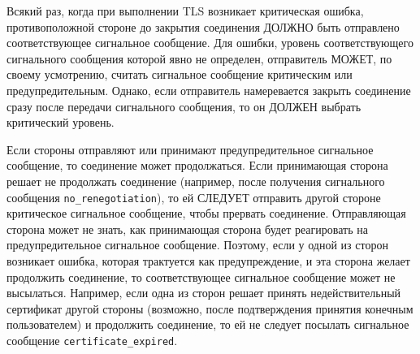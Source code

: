 Всякий раз, когда при выполнении TLS возникает критическая ошибка, 
противоположной стороне до закрытия соединения ДОЛЖНО быть отправлено 
соответствующее сигнальное сообщение. Для ошибки, уровень соответствующего 
сигнального сообщения которой явно не определен, отправитель МОЖЕТ, по 
своему усмотрению, считать сигнальное сообщение критическим или 
предупредительным. Однако, если отправитель намеревается закрыть 
соединение сразу после передачи сигнального сообщения, то он ДОЛЖЕН 
выбрать критический уровень.  

Если стороны отправляют или принимают предупредительное сигнальное 
сообщение, то соединение может продолжаться. Если принимающая сторона 
решает не продолжать соединение (например, после получения сигнального 
сообщения \lstinline{no_renegotiation}), то ей СЛЕДУЕТ отправить другой стороне 
критическое сигнальное сообщение, чтобы прервать соединение. Отправляющая 
сторона может не знать, как принимающая сторона будет реагировать на 
предупредительное сигнальное сообщение. Поэтому, если у одной из сторон 
возникает ошибка, которая трактуется как предупреждение, и эта сторона 
желает продолжить соединение, то соответствующее сигнальное сообщение 
может не высылаться. Например, если одна из сторон решает принять 
недействительный сертификат другой стороны (возможно, после подтверждения 
принятия конечным пользователем) и продолжить соединение, то ей не следует 
посылать сигнальное сообщение \lstinline{certificate_expired}. 

